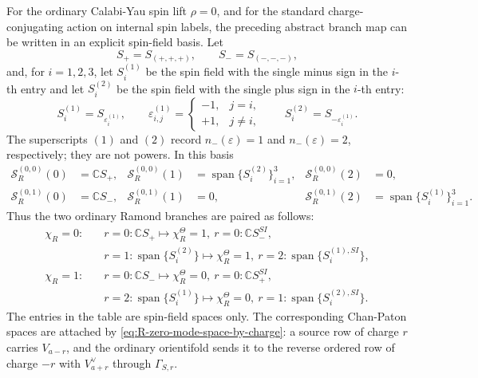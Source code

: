 \documentclass[11pt]{article}
\newcommand{\C}{\mathbb{C}}
\begin{document}
For the ordinary Calabi-Yau spin lift \(\rho=0\), and for the standard charge-conjugating action
on internal spin labels, the preceding abstract branch map can be written in an explicit
spin-field basis. Let
\begin{equation}
  S_{+}=S_{(+,+,+)},
  \qquad
  S_{-}=S_{(-,-,-)},
  \label{eq:R-singlet-spin-basis}
\end{equation}
and, for \(i=1,2,3\), let \(S_i^{(1)}\) be the spin field with the single minus sign in the
\(i\)-th entry and let \(S_i^{(2)}\) be the spin field with the single plus sign in the
\(i\)-th entry:
\begin{equation}
  S_i^{(1)}
  =
  S_{\varepsilon_i^{(1)}},
  \qquad
  \varepsilon_{i,j}^{(1)}
  =
  \begin{cases}
    -1, & j=i,\\
    +1, & j\ne i,
  \end{cases}
  \qquad
  S_i^{(2)}
  =
  S_{-\varepsilon_i^{(1)}} .
  \label{eq:R-triplet-spin-basis}
\end{equation}
The superscripts \((1)\) and \((2)\) record \(n_-(\varepsilon)=1\) and
\(n_-(\varepsilon)=2\), respectively; they are not powers. In this basis
\begin{align}
  \mathcal S_R^{(0,0)}(0)&=\C S_+,
  &
  \mathcal S_R^{(0,0)}(1)&=\operatorname{span}\{S_i^{(2)}\}_{i=1}^{3},
  &
  \mathcal S_R^{(0,0)}(2)&=0,
  \label{eq:R-rho-zero-even-branch-basis}
  \\
  \mathcal S_R^{(0,1)}(0)&=\C S_-,
  &
  \mathcal S_R^{(0,1)}(1)&=0,
  &
  \mathcal S_R^{(0,1)}(2)&=\operatorname{span}\{S_i^{(1)}\}_{i=1}^{3}.
  \label{eq:R-rho-zero-odd-branch-basis}
\end{align}
Thus the two ordinary Ramond branches are paired as follows:
\begin{equation}
  \begin{aligned}
  \chi_R=0:\quad
  &r=0:\C S_+
    \longmapsto
    \chi_R^\Theta=1,\ r=0:\C S_-^{SI},
  \\
  &r=1:\operatorname{span}\{S_i^{(2)}\}
    \longmapsto
    \chi_R^\Theta=1,\ r=2:\operatorname{span}\{S_i^{(1),SI}\},
  \\
  \chi_R=1:\quad
  &r=0:\C S_-
    \longmapsto
    \chi_R^\Theta=0,\ r=0:\C S_+^{SI},
  \\
  &r=2:\operatorname{span}\{S_i^{(1)}\}
    \longmapsto
    \chi_R^\Theta=0,\ r=1:\operatorname{span}\{S_i^{(2),SI}\}.
  \end{aligned}
  \label{eq:R-rho-zero-ordinary-branch-pair-table}
\end{equation}
The entries in the table are spin-field spaces only. The corresponding Chan-Paton spaces are
attached by \eqref{eq:R-zero-mode-space-by-charge}: a source row of charge \(r\) carries
\(V_{a-r}\), and the ordinary orientifold sends it to the reverse ordered row of charge
\(-r\) with \(V_{a+r}^{\vee}\) through \(\Gamma_{S,r}\).
\end{document}
